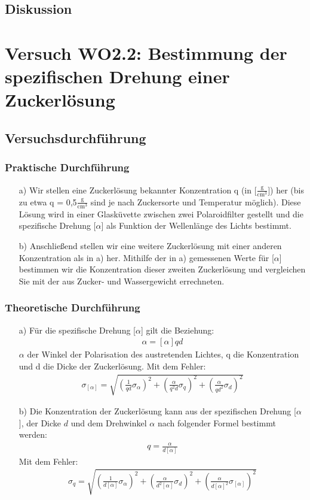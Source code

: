 \documentclass[12pt]{scrartcl}
\begin{document}
\subsection{Diskussion}

\section{Versuch WO2.2:
Bestimmung der spezifischen Drehung einer Zuckerlösung}
\subsection{Versuchsdurchführung}
\subsubsection{Praktische Durchführung}
\begin{enumerate}
\item[a)] Wir stellen eine Zuckerlösung bekannter Konzentration q (in [$\frac{\text{g}}{\text{cm}^3}]$)
her (bis zu etwa q = 0,5$\frac{\text{g}}{\text{cm}^3}$
sind je nach Zuckersorte und Temperatur möglich).
Diese Lösung wird in einer Glasküvette zwischen zwei Polaroidfilter gestellt und die spezifische Drehung [$\alpha$]
als Funktion der Wellenlänge des Lichts bestimmt.
\item[b)] Anschließend stellen wir eine weitere Zuckerlösung mit einer anderen Konzentration als
in a) her. Mithilfe der in a) gemessenen Werte für
[$\alpha$] bestimmen wir die Konzentration dieser zweiten Zuckerlösung und vergleichen Sie mit der aus Zucker- und
Wassergewicht errechneten.
\end{enumerate}
\subsubsection{Theoretische Durchführung}
\begin{enumerate}
\item[a)] Für die spezifische Drehung [$\alpha$] gilt die Beziehung:
\begin{align}
\alpha = [\alpha] q d
\end{align}
$\alpha$ der Winkel der Polarisation des austretenden Lichtes, q die Konzentration und d die Dicke der Zuckerlösung.
Mit dem Fehler:
\begin{align}
\sigma_{[\alpha]} = \sqrt{
\left(\frac{1}{q d}\sigma_{\alpha}\right)^2+
\left(\frac{\alpha}{q^2 d}\sigma_q\right)^2+
\left(\frac{\alpha}{q d^2}\sigma_d\right)^2}
\end{align}
\item[b)]
Die Konzentration der Zuckerlösung kann aus der spezifischen Drehung [$\alpha$], der Dicke $d$ und dem Drehwinkel $\alpha$ nach folgender Formel bestimmt werden:
\begin{align}
q = \frac{\alpha}{d [\alpha]}
\end{align}
Mit dem Fehler:
\begin{align}
\sigma_q = \sqrt{
\left(\frac{1}{d [\alpha]}\sigma_\alpha \right)^2+
\left(\frac{\alpha}{d^2 [\alpha]}\sigma_d \right)^2+
\left(\frac{\alpha}{d [\alpha]^2}\sigma_{[\alpha]}\right)^2}
\end{align}
\end{enumerate}
\end{document}
